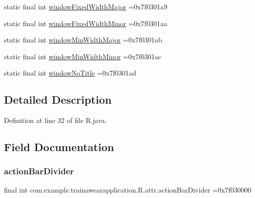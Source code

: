 \begin{DoxyCompactItemize}
\item 
static final int \mbox{\hyperlink{classcom_1_1example_1_1trainawearapplication_1_1_r_1_1attr_a777f6600986b72208b0394fcd5eedc23}{window\+Fixed\+Width\+Major}} =0x7f0301a9
\item 
static final int \mbox{\hyperlink{classcom_1_1example_1_1trainawearapplication_1_1_r_1_1attr_a6c9982d085664f162825a9fe2f119c93}{window\+Fixed\+Width\+Minor}} =0x7f0301aa
\item 
static final int \mbox{\hyperlink{classcom_1_1example_1_1trainawearapplication_1_1_r_1_1attr_a50c58fbb0c69bef0302b1a976c09da4f}{window\+Min\+Width\+Major}} =0x7f0301ab
\item 
static final int \mbox{\hyperlink{classcom_1_1example_1_1trainawearapplication_1_1_r_1_1attr_ae5a639562b2329aeae3f0f0cb8093450}{window\+Min\+Width\+Minor}} =0x7f0301ac
\item 
static final int \mbox{\hyperlink{classcom_1_1example_1_1trainawearapplication_1_1_r_1_1attr_a2b566635d5ee696b197c292fd1245839}{window\+No\+Title}} =0x7f0301ad
\end{DoxyCompactItemize}


\subsection{Detailed Description}


Definition at line 32 of file R.\+java.



\subsection{Field Documentation}
\mbox{\label{classcom_1_1example_1_1trainawearapplication_1_1_r_1_1attr_a4c8cb097f6c5df7a666fa452ad9951c0}} 
\subsubsection{\texorpdfstring{actionBarDivider}{actionBarDivider}}
{\footnotesize\ttfamily final int com.\+example.\+trainawearapplication.\+R.\+attr.\+action\+Bar\+Divider =0x7f030000\hspace{0.3cm}{\ttfamily [static]}}

